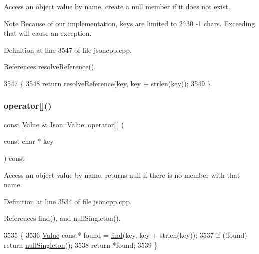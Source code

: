 Access an object value by name, create a null member if it does not exist. \begin{DoxyNote}{Note}
Because of our implementation, keys are limited to 2$^\wedge$30 -\/1 chars. Exceeding that will cause an exception. 
\end{DoxyNote}


Definition at line 3547 of file jsoncpp.\+cpp.



References resolve\+Reference().


\begin{DoxyCode}
3547                                         \{
3548   \textcolor{keywordflow}{return} \hyperlink{class_json_1_1_value_a9ff9cdae2c8f4155bab603d750b0b3f1}{resolveReference}(key, key + strlen(key));
3549 \}
\end{DoxyCode}
\mbox{\label{class_json_1_1_value_a1b0498b7b2a520a68137f682d91abdd5}} 
\subsubsection{\texorpdfstring{operator[]()}{operator[]()}\hspace{0.1cm}{\footnotesize\ttfamily [6/9]}}
{\footnotesize\ttfamily const \hyperlink{class_json_1_1_value}{Value} \& Json\+::\+Value\+::operator\mbox{[}$\,$\mbox{]} (\begin{DoxyParamCaption}\item[{const char $\ast$}]{key }\end{DoxyParamCaption}) const}

Access an object value by name, returns null if there is no member with that name. 

Definition at line 3534 of file jsoncpp.\+cpp.



References find(), and null\+Singleton().


\begin{DoxyCode}
3535 \{
3536   \hyperlink{class_json_1_1_value_ada6ba1369448fb0240bccc36efaa46f7}{Value} \textcolor{keyword}{const}* found = \hyperlink{class_json_1_1_value_afb007b9ce9b2cf9d5f667a07e5e0349f}{find}(key, key + strlen(key));
3537   \textcolor{keywordflow}{if} (!found) \textcolor{keywordflow}{return} \hyperlink{class_json_1_1_value_af2f124567acc35d021a424e53ebdfcab}{nullSingleton}();
3538   \textcolor{keywordflow}{return} *found;
3539 \}
\end{DoxyCode}
\mbox{\label{class_json_1_1_value_aedd1e152756a4cc8c1ebac0dd7aeeb78}} 
